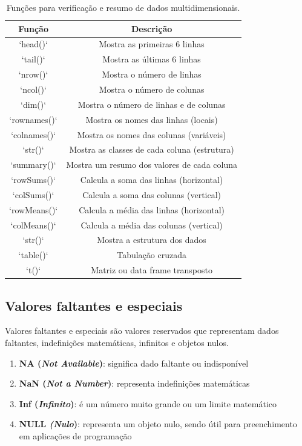 \documentclass[
]{book}
\providecommand{\tightlist}{%
  \setlength{\itemsep}{0pt}\setlength{\parskip}{0pt}}
\begin{document}
\begin{table}

\caption{\label{tab:tab-funcoes-conf-multi}Funções para verificação e resumo de dados multidimensionais.}
\centering
\begin{tabular}[t]{c|c}
\hline
Função & Descrição\\
\hline
`head()` & Mostra as primeiras 6 linhas\\
\hline
`tail()` & Mostra as últimas 6 linhas\\
\hline
`nrow()` & Mostra o número de linhas\\
\hline
`ncol()` & Mostra o número de colunas\\
\hline
`dim()` & Mostra o número de linhas e de colunas\\
\hline
`rownames()` & Mostra os nomes das linhas (locais)\\
\hline
`colnames()` & Mostra os nomes das colunas (variáveis)\\
\hline
`str()` & Mostra as classes de cada coluna (estrutura)\\
\hline
`summary()` & Mostra um resumo dos valores de cada coluna\\
\hline
`rowSums()` & Calcula a soma das linhas (horizontal)\\
\hline
`colSums()` & Calcula a soma das colunas (vertical)\\
\hline
`rowMeans()` & Calcula a média das linhas (horizontal)\\
\hline
`colMeans()` & Calcula a média das colunas (vertical)\\
\hline
`str()` & Mostra a estrutura dos dados\\
\hline
`table()` & Tabulação cruzada\\
\hline
`t()` & Matriz ou data frame transposto\\
\hline
\end{tabular}
\end{table}

\hypertarget{valores-faltantes-e-especiais}{%
\subsection{Valores faltantes e especiais}\label{valores-faltantes-e-especiais}}

Valores faltantes e especiais são valores reservados que representam dados faltantes, indefinições matemáticas, infinitos e objetos nulos.

\begin{enumerate}
\def\labelenumi{\arabic{enumi}.}
\tightlist
\item
  \textbf{NA (\emph{Not Available})}: significa dado faltante ou indisponível
\item
  \textbf{NaN (\emph{Not a Number})}: representa indefinições matemáticas
\item
  \textbf{Inf (\emph{Infinito})}: é um número muito grande ou um limite matemático
\item
  \textbf{NULL \emph{(Nulo})}: representa um objeto nulo, sendo útil para preenchimento em aplicações de programação
\end{enumerate}
\end{document}
